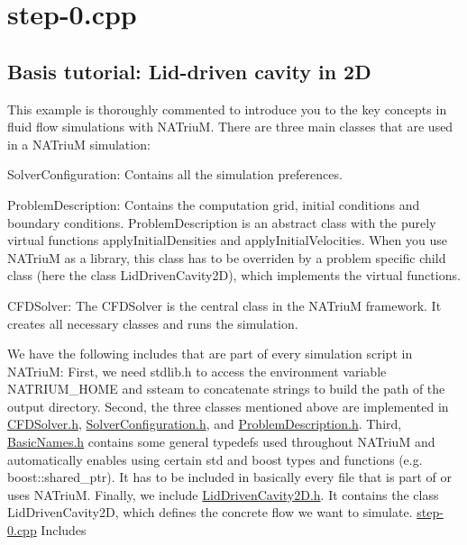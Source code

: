 \hypertarget{step-0_8cpp-example}{
\section{step-\/0.cpp}
}
\hypertarget{/mnt/fdrive/akraem3m/workspace/NATriuM/src/examples/step-0/step-0.cpp_sec_intro}{}\subsection{Basis tutorial: Lid-\/driven cavity in 2D}\label{/mnt/fdrive/akraem3m/workspace/NATriuM/src/examples/step-0/step-0.cpp_sec_intro}
This example is thoroughly commented to introduce you to the key concepts in fluid flow simulations with NATriuM. There are three main classes that are used in a NATriuM simulation:
\begin{DoxyItemize}
\item SolverConfiguration: Contains all the simulation preferences.
\item ProblemDescription: Contains the computation grid, initial conditions and boundary conditions. ProblemDescription is an abstract class with the purely virtual functions applyInitialDensities and applyInitialVelocities. When you use NATriuM as a library, this class has to be overriden by a problem specific child class (here the class LidDrivenCavity2D), which implements the virtual functions.
\item CFDSolver: The CFDSolver is the central class in the NATriuM framework. It creates all necessary classes and runs the simulation.
\end{DoxyItemize}

We have the following includes that are part of every simulation script in NATriuM: First, we need stdlib.h to access the environment variable NATRIUM\_\-HOME and ssteam to concatenate strings to build the path of the output directory. Second, the three classes mentioned above are implemented in \hyperlink{CFDSolver_8h}{CFDSolver.h}, \hyperlink{SolverConfiguration_8h}{SolverConfiguration.h}, and \hyperlink{ProblemDescription_8h}{ProblemDescription.h}. Third, \hyperlink{BasicNames_8h}{BasicNames.h} contains some general typedefs used throughout NATriuM and automatically enables using certain std and boost types and functions (e.g. boost::shared\_\-ptr). It has to be included in basically every file that is part of or uses NATriuM. Finally, we include \hyperlink{LidDrivenCavity2D_8h}{LidDrivenCavity2D.h}. It contains the class LidDrivenCavity2D, which defines the concrete flow we want to simulate.  \hyperlink{step-0_8cpp}{step-\/0.cpp} Includes

